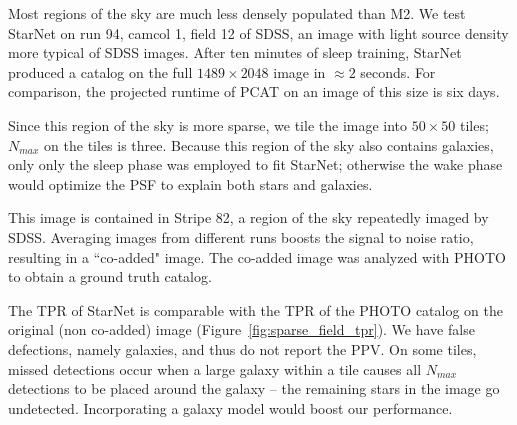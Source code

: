 Most regions of the sky are much less densely populated than M2. 
We test StarNet on run 94, camcol 1, field 12 of SDSS,
an image with light source density more typical of SDSS images.
After ten minutes of sleep training, StarNet produced a catalog on the full $1489\times 2048$ image in $\approx2$ seconds. 
For comparison, the projected runtime of PCAT on an image of this size is six days.  

Since this region of the sky is more sparse, we tile the image into $50\times 50$ tiles; $N_{max}$ on the tiles is three. 
Because this region of the sky also contains galaxies, only only the sleep phase was employed to fit StarNet; 
otherwise the wake phase would optimize the PSF to explain both stars and galaxies. 

This image is contained in Stripe 82, a region of the sky repeatedly imaged by SDSS. Averaging images from different runs boosts the signal to noise ratio, resulting in a ``co-added" image. 
The co-added image was analyzed with PHOTO to obtain a ground truth catalog. 

The TPR of StarNet is comparable with the TPR of the PHOTO catalog on the original (non co-added) image (Figure~\ref{fig:sparse_field_tpr}). 
We have false defections, namely galaxies, and thus 
do not report the PPV. 
On some tiles, missed detections occur when a large galaxy within a tile causes all $N_{max}$ detections to be placed around the galaxy -- the remaining stars in the image go undetected. 
Incorporating a galaxy model would boost our performance. 


